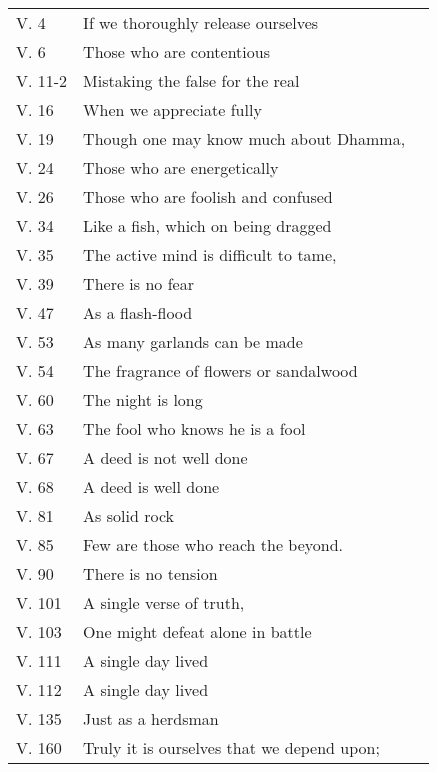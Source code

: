 
{\smaller
\setlength{\parskip}{0pt}
\setlength{\parindent}{0pt}

\begin{longtable}[c]{llr}
V. 4 & If we thoroughly release ourselves & \pageref{dhp-4}\\
V. 6 & Those who are contentious & \pageref{dhp-6}\\
V. 11-2 & Mistaking the false for the real & \pageref{dhp-11}\\
V. 16 & When we appreciate fully & \pageref{dhp-16}\\
V. 19 & Though one may know much about Dhamma, & \pageref{dhp-19}\\
V. 24 & Those who are energetically & \pageref{dhp-24}\\
V. 26 & Those who are foolish and confused & \pageref{dhp-26}\\
V. 34 & Like a fish, which on being dragged  & \pageref{dhp-34}\\
V. 35 & The active mind is difficult to tame, & \pageref{dhp-35}\\
V. 39 & There is no fear & \pageref{dhp-39}\\
V. 47 & As a flash-flood & \pageref{dhp-47}\\
V. 53 & As many garlands can be made & \pageref{dhp-53}\\
V. 54 & The fragrance of flowers or sandalwood & \pageref{dhp-54}\\
V. 60 & The night is long & \pageref{dhp-60}\\
V. 63 & The fool who knows he is a fool & \pageref{dhp-63}\\
V. 67 & A deed is not well done & \pageref{dhp-67}\\
V. 68 & A deed is well done & \pageref{dhp-68}\\
V. 81 & As solid rock & \pageref{dhp-81}\\
V. 85 & Few are those who reach the beyond. & \pageref{dhp-85}\\
V. 90 & There is no tension & \pageref{dhp-90}\\
V. 101 & A single verse of truth, & \pageref{dhp-101}\\
V. 103 & One might defeat alone in battle & \pageref{dhp-103}\\
V. 111 & A single day lived & \pageref{dhp-111}\\
V. 112 & A single day lived & \pageref{dhp-112}\\
V. 135 & Just as a herdsman & \pageref{dhp-135}\\
V. 160 & Truly it is ourselves that we depend upon; & \pageref{dhp-160}\\

\end{longtable}}
